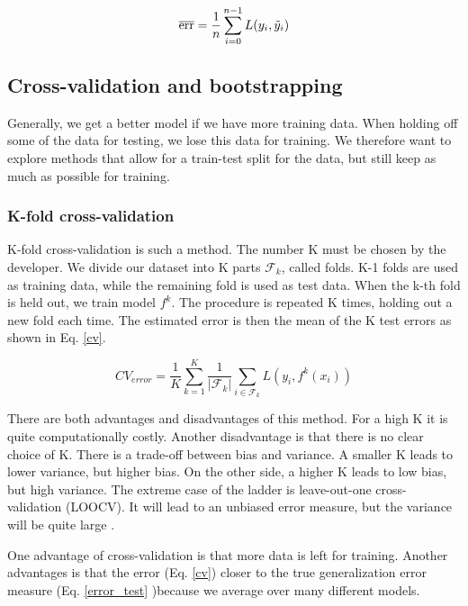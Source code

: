 \begin{equation}
    \overline{\text{err}} = \frac{1}{n}\sum_{i=0}^{n-1} L(y_i, \Tilde{y}_i)
\end{equation} 


\subsection{Cross-validation and bootstrapping}

Generally, we get a better model if we have more training data.  When holding off some of the data for testing, we lose this data for training. We therefore want to explore methods that allow for a train-test split for the data, but still keep as much as possible for training. 

\subsubsection{K-fold cross-validation}
K-fold cross-validation is such a method. The number K must be chosen by the developer. We divide our dataset into K parts $\mathcal{F}_k$, called folds. K-1 folds are used as training data, while the remaining fold is used as test data. When the k-th fold is held out, we train model $f^{k}$. 
The procedure is repeated K times, holding out a new fold each time. The estimated error is then the mean of the K test errors as shown in Eq. \ref{cv}. \citep[p. 241]{hastie}


\begin{equation}\label{cv}
    CV_{error} = \frac{1}{K} \sum_{k=1}^{K} \frac{1}{|\mathcal{F}_k|} \sum_{i \in \mathcal{F}_k} L\left(y_i, f^{k}({x}_i)\right) 
\end{equation}

There are both advantages and disadvantages of this method. For a high K it is quite computationally costly. Another disadvantage is that there is no clear choice of K. There is a trade-off between bias and variance. A smaller K leads to lower variance, but higher bias. On the other side, a higher K leads to low bias, but high variance. The extreme case of the ladder is leave-out-one cross-validation (LOOCV). It will lead to an unbiased error measure, but the variance will be quite large \citep[p. 242]{hastie}.

One advantage of cross-validation is that more data is left for training. Another advantages is that the error (Eq. \ref{cv}) closer to the true generalization error measure (Eq. \ref{error_test} )because we average over many different models.  


